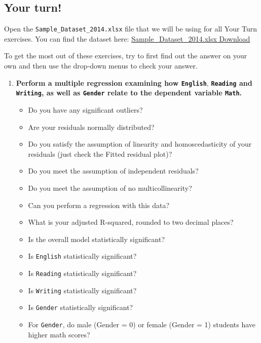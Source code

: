 \documentclass[
]{book}
\begin{document}
\hypertarget{your-turn-9}{%
\subsection{Your turn!}\label{your-turn-9}}

Open the \texttt{Sample\_Dataset\_2014.xlsx} file that we will be using for all Your Turn exercises. You can find the dataset here: \href{https://github.com/danawanzer/stats-with-jamovi/blob/master/data/Sample_Dataset_2014.xlsx}{Sample\_Dataset\_2014.xlsx Download}

To get the most out of these exercises, try to first find out the answer on your own and then use the drop-down menus to check your answer.

\begin{enumerate}
\def\labelenumi{\arabic{enumi}.}
\item
  \textbf{Perform a multiple regression examining how \texttt{English}}, \textbf{\texttt{Reading} and \texttt{Writing}, as well as \texttt{Gender} relate to the dependent variable \texttt{Math}.}

  \begin{itemize}
  \item
    Do you have any significant outliers?
  \item
    Are your residuals normally distributed?
  \item
    Do you satisfy the assumption of linearity and homoscedasticity of your residuals (just check the Fitted residual plot)?
  \item
    Do you meet the assumption of independent residuals?
  \item
    Do you meet the assumption of no multicollinearity?
  \item
    Can you perform a regression with this data?
  \item
    What is your adjusted R-squared, rounded to two decimal places?
  \item
    Is the overall model statistically significant?
  \item
    Is \texttt{English} statistically significant?
  \item
    Is \texttt{Reading} statistically significant?
  \item
    Is \texttt{Writing} statistically significant?
  \item
    Is \texttt{Gender} statistically significant?
  \item
    For \texttt{Gender}, do male (Gender = 0) or female (Gender = 1) students have higher math scores?
  \end{itemize}
\end{enumerate}
\end{document}
